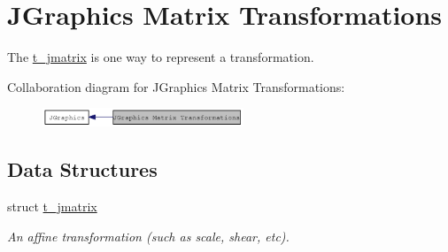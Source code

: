 \hypertarget{group__jmatrix}{
\section{JGraphics Matrix Transformations}
\label{group__jmatrix}
}


The \hyperlink{structt__jmatrix}{t\_\-jmatrix} is one way to represent a transformation.  


Collaboration diagram for JGraphics Matrix Transformations:\nopagebreak
\begin{figure}[H]
\begin{center}
\leavevmode
\includegraphics[width=170pt]{group__jmatrix}
\end{center}
\end{figure}
\subsection*{Data Structures}
\begin{DoxyCompactItemize}
\item 
struct \hyperlink{structt__jmatrix}{t\_\-jmatrix}
\begin{DoxyCompactList}\small\item\em An affine transformation (such as scale, shear, etc). \item\end{DoxyCompactList}\end{DoxyCompactItemize}
